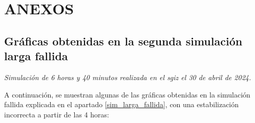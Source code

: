 
\newpage
\section*{ANEXOS} \label{sec:anexos} %
{} %

\renewcommand{\thesubsection}{\Alph{subsection}} %
\renewcommand{\thetable}{\Alph{subsection}.\arabic{table}}
\renewcommand{\thefigure}{\Alph{subsection}.\arabic{figure}}
\renewcommand{\thecode}{\Alph{subsection}.\arabic{code}}

\setcounter{subsection}{0}
\setcounter{table}{0}
\setcounter{figure}{0}

\subsection{Gráficas obtenidas en la segunda simulación larga fallida} \label{graficas_erroneas}

\textit{Simulación de 6 horas y 40 minutos realizada en el \acrshort{sgiz} el 30 de abril de 2024.}

A continuación, se muestran algunas de las gráficas obtenidas en la simulación fallida explicada en el apartado \ref{sim_larga_fallida}, con una estabilización incorrecta a partir de las 4 horas:

